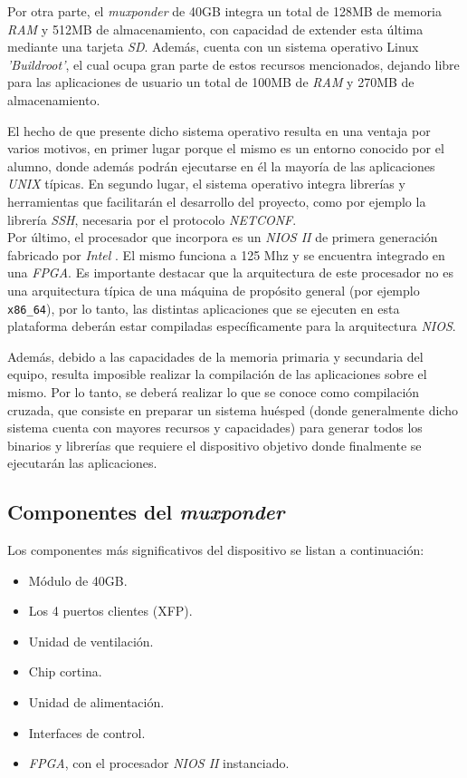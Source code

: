  Por otra parte, el \textit{muxponder} de 40GB integra un total de 128MB de memoria \textit{RAM} y 512MB de almacenamiento, con capacidad de extender esta última mediante una tarjeta \textit{SD}. Además, cuenta con un sistema operativo Linux \textit{'Buildroot'}, el cual ocupa gran parte de estos recursos mencionados, dejando libre para las aplicaciones de usuario un total de 100MB de \textit{RAM} y 270MB de almacenamiento.

El hecho de que presente dicho sistema operativo resulta en una ventaja por varios motivos, en primer lugar porque el mismo es un entorno conocido por el alumno, donde además podrán ejecutarse en él la mayoría de las aplicaciones \textit{UNIX} típicas. En segundo lugar, el sistema operativo integra librerías y herramientas que facilitarán el desarrollo del proyecto, como por ejemplo la librería \textit{SSH}, necesaria por el protocolo \textit{NETCONF}.
\\

Por último, el procesador que incorpora es un \textit{NIOS II} de primera generación fabricado por \textit{Intel} \parencite{intelaltera}. El mismo funciona a 125 Mhz y se encuentra integrado en una \textit{FPGA}. Es importante destacar que la arquitectura de este procesador no es una arquitectura típica de una máquina de propósito general (por ejemplo \texttt{x86\_64}), por lo tanto, las distintas aplicaciones que se ejecuten en esta plataforma deberán estar compiladas específicamente para la arquitectura \textit{NIOS}. 

Además, debido a las capacidades de la memoria primaria y secundaria del equipo, resulta imposible realizar la compilación de las aplicaciones sobre el mismo. Por lo tanto, se deberá realizar lo que se conoce como compilación cruzada, que consiste en preparar un sistema huésped (donde generalmente dicho sistema cuenta con mayores recursos y capacidades) para generar todos los binarios y librerías que requiere el dispositivo objetivo donde finalmente se ejecutarán las aplicaciones.

\newpage

\subsection{Componentes del \textit{muxponder}}

Los componentes más significativos del dispositivo se listan a continuación:

\begin{itemize}
	\item Módulo de 40GB.
	\item Los 4 puertos clientes (XFP).
	\item Unidad de ventilación.
	\item Chip cortina.
	\item Unidad de alimentación.
	\item Interfaces de control.
	\item \textit{FPGA}, con el procesador \textit{NIOS II} instanciado.
\end{itemize}


